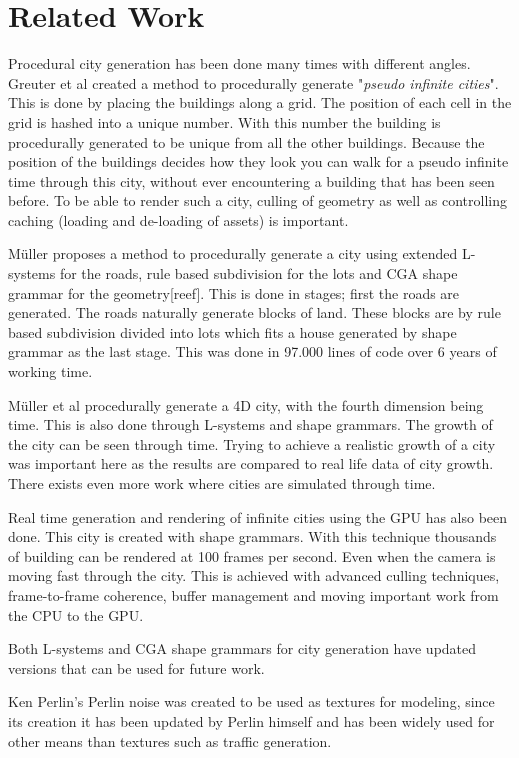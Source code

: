 \section{Related Work}
Procedural city generation has been done many times with different angles. Greuter et al\cite{PseudoInfiniteCities} created a method to procedurally generate "\textit{pseudo infinite cities}". This is done by placing the buildings along a grid. The position of each cell in the grid is hashed into a unique number. With this number the building is procedurally generated to be unique from all the other buildings. Because the position of the buildings decides how they look you can walk for a pseudo infinite time through this city, without ever encountering a building that has been seen before. To be able to render such a city, culling of geometry as well as controlling caching (loading and de-loading of assets) is important\cite{PseudoInfiniteCities}.

\par 
M\"uller proposes a method to procedurally generate a city using extended L-systems for the roads, rule based subdivision for the lots and CGA shape grammar for the geometry[reef]. This is done in stages; first the roads are generated. The roads naturally generate blocks of land. These blocks are by rule based subdivision divided into lots which fits a house generated by shape grammar as the last stage. This was done in 97.000 lines of code over 6 years of working time\cite{ProceduralModeling}\cite{ProceduralModeling6}.

\par
M\"uller et al procedurally generate a 4D city, with the fourth dimension being time. This is also done through L-systems and shape grammars. The growth of the city can be seen through time. Trying to achieve a realistic growth of a city was important here as the results are compared to real life data of city growth. \cite{4DCities} There exists even more work where cities are simulated through time\cite{AutonomousTimeVarying}.


\par
Real time generation and rendering of infinite cities using the GPU has also been done\cite{InfiniteCities}. This city is created with shape grammars. With this technique thousands of building can be rendered at 100 frames per second. Even when the camera is moving fast through the city. This is achieved with advanced culling techniques, frame-to-frame coherence, buffer management and moving important work from the CPU to the GPU.

\par
Both L-systems and CGA shape grammars for city generation have updated versions that can be used for future work\cite{InteractiveProceduralStreet}\cite{AdvancedProceduralModel}.

\par
Ken Perlin's Perlin noise was created to be used as textures for modeling, since its creation it has been updated by Perlin himself and has been widely used for other means than textures such as traffic generation\cite{PerlinNoise}\cite{TrafficGenerator}.